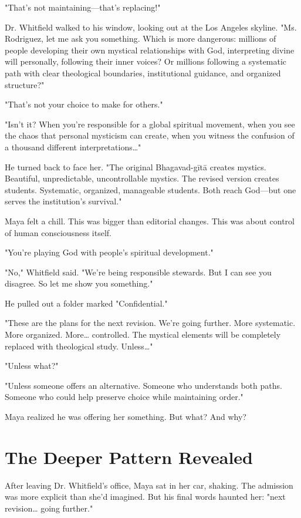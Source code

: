 \documentclass[11pt,twoside]{book}
\begin{document}
\begin{itemize}
"That's not maintaining—that's replacing!"

Dr. Whitfield walked to his window, looking out at the Los Angeles skyline. "Ms. Rodriguez, let me ask you something. Which is more dangerous: millions of people developing their own mystical relationships with God, interpreting divine will personally, following their inner voices? Or millions following a systematic path with clear theological boundaries, institutional guidance, and organized structure?"

"That's not your choice to make for others."

"Isn't it? When you're responsible for a global spiritual movement, when you see the chaos that personal mysticism can create, when you witness the confusion of a thousand different interpretations\ldots{}"

He turned back to face her. "The original Bhagavad-gītā creates mystics. Beautiful, unpredictable, uncontrollable mystics. The revised version creates students. Systematic, organized, manageable students. Both reach God—but one serves the institution's survival."

Maya felt a chill. This was bigger than editorial changes. This was about control of human consciousness itself.

"You're playing God with people's spiritual development."

"No," Whitfield said. "We're being responsible stewards. But I can see you disagree. So let me show you something."

He pulled out a folder marked "Confidential."

"These are the plans for the next revision. We're going further. More systematic. More organized. More\ldots{} controlled. The mystical elements will be completely replaced with theological study. Unless\ldots{}"

"Unless what?"

"Unless someone offers an alternative. Someone who understands both paths. Someone who could help preserve choice while maintaining order."

Maya realized he was offering her something. But what? And why?
\end{itemize}
\section*{The Deeper Pattern Revealed}
\label{sec:org7a574e5}

After leaving Dr. Whitfield's office, Maya sat in her car, shaking. The admission was more explicit than she'd imagined. But his final words haunted her: "next revision\ldots{} going further."
\end{document}
